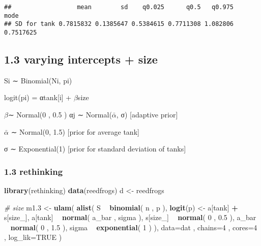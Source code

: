 \documentclass[
]{article}
\newenvironment{Shaded}{\begin{snugshade}}{\end{snugshade}}
\newcommand{\CommentTok}[1]{\textcolor[rgb]{0.56,0.35,0.01}{\textit{#1}}}
\newcommand{\DataTypeTok}[1]{\textcolor[rgb]{0.13,0.29,0.53}{#1}}
\newcommand{\DecValTok}[1]{\textcolor[rgb]{0.00,0.00,0.81}{#1}}
\newcommand{\FloatTok}[1]{\textcolor[rgb]{0.00,0.00,0.81}{#1}}
\newcommand{\KeywordTok}[1]{\textcolor[rgb]{0.13,0.29,0.53}{\textbf{#1}}}
\newcommand{\NormalTok}[1]{#1}
\newcommand{\OperatorTok}[1]{\textcolor[rgb]{0.81,0.36,0.00}{\textbf{#1}}}
\newcommand{\OtherTok}[1]{\textcolor[rgb]{0.56,0.35,0.01}{#1}}
\newcommand{\StringTok}[1]{\textcolor[rgb]{0.31,0.60,0.02}{#1}}
\begin{document}
\begin{verbatim}
##                  mean        sd    q0.025      q0.5   q0.975      mode
## SD for tank 0.7815832 0.1385647 0.5384615 0.7711308 1.082806 0.7517625
\end{verbatim}

\hypertarget{varying-intercepts-size}{%
\subsection{1.3 varying intercepts +
size}\label{varying-intercepts-size}}

Si ∼ Binomial(Ni, pi)

logit(pi) = αtank{[}i{]} + \(\beta\)size

\(\beta\)∼ Normal(0 , 0.5 ) αj ∼ Normal(\(\bar{\alpha}\), σ) {[}adaptive
prior{]}

\(\bar{\alpha}\) ∼ Normal(0, 1.5) {[}prior for average tank{]}

σ ∼ Exponential(1) {[}prior for standard deviation of tanks{]}

\hypertarget{rethinking-2}{%
\subsubsection{1.3 rethinking}\label{rethinking-2}}

\begin{Shaded}
\begin{Highlighting}[]
\KeywordTok{library}\NormalTok{(rethinking) }
\KeywordTok{data}\NormalTok{(reedfrogs)}
\NormalTok{d <-}\StringTok{ }\NormalTok{reedfrogs}

\CommentTok{# size}
\NormalTok{m1}\FloatTok{.3}\NormalTok{ <-}\StringTok{ }\KeywordTok{ulam}\NormalTok{( }\KeywordTok{alist}\NormalTok{(}
\NormalTok{S }\OperatorTok{~}\StringTok{ }\KeywordTok{binomial}\NormalTok{( n , p ),}
\KeywordTok{logit}\NormalTok{(p) <-}\StringTok{ }\NormalTok{a[tank] }\OperatorTok{+}\StringTok{ }\NormalTok{s[size_], }
\NormalTok{a[tank] }\OperatorTok{~}\StringTok{ }\KeywordTok{normal}\NormalTok{( a_bar , sigma ), }
\NormalTok{s[size_] }\OperatorTok{~}\StringTok{ }\KeywordTok{normal}\NormalTok{( }\DecValTok{0}\NormalTok{ , }\FloatTok{0.5}\NormalTok{ ), }
\NormalTok{a_bar }\OperatorTok{~}\StringTok{ }\KeywordTok{normal}\NormalTok{( }\DecValTok{0}\NormalTok{ , }\FloatTok{1.5}\NormalTok{ ),}
\NormalTok{sigma }\OperatorTok{~}\StringTok{ }\KeywordTok{exponential}\NormalTok{( }\DecValTok{1}\NormalTok{ )}
\NormalTok{), }\DataTypeTok{data=}\NormalTok{dat , }\DataTypeTok{chains=}\DecValTok{4}\NormalTok{ , }\DataTypeTok{cores=}\DecValTok{4}\NormalTok{ , }\DataTypeTok{log_lik=}\OtherTok{TRUE}\NormalTok{ )}
\end{Highlighting}
\end{Shaded}
\end{document}
